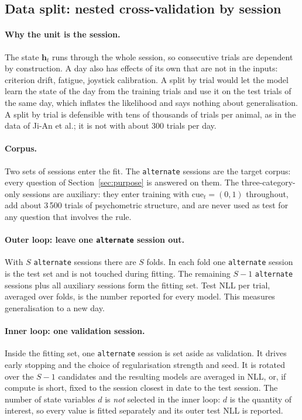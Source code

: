 \documentclass[11pt,a4paper]{article}
\newcommand{\vect}[1]{\bm{#1}}
\newcommand{\cue}{\mathrm{cue}}
\begin{document}
\subsection{Data split: nested cross-validation by session}
\label{sec:split}

\paragraph{Why the unit is the session.} The state $\vect{h}_t$ runs through the whole
session, so consecutive trials are dependent by construction. A day also has effects of
its own that are not in the inputs: criterion drift, fatigue, joystick calibration. A
split by trial would let the model learn the state of the day from the training trials
and use it on the test trials of the same day, which inflates the likelihood and says
nothing about generalisation. A split by trial is defensible with tens of thousands of
trials per animal, as in the data of Ji-An et al.; it is not with about 300 trials per
day.

\paragraph{Corpus.} Two sets of sessions enter the fit. The \texttt{alternate}
sessions are the target corpus: every question of Section~\ref{sec:purpose} is answered on them. The
three-category-only sessions are auxiliary: they enter training with
$\cue_t = (0, 1)$ throughout, add about 3\,500 trials of psychometric structure, and are
never used as test for any question that involves the rule.

\paragraph{Outer loop: leave one \texttt{alternate} session out.} With $S$
\texttt{alternate} sessions there are $S$ folds. In each fold one \texttt{alternate}
session is the test set and is not touched during fitting. The remaining $S-1$
\texttt{alternate} sessions plus all auxiliary sessions form the fitting set. Test NLL
per trial, averaged over folds, is the number reported for every model. This measures
generalisation to a new day.

\paragraph{Inner loop: one validation session.} Inside the fitting set, one
\texttt{alternate} session is set aside as validation. It drives early stopping and the
choice of regularisation strength and seed. It is rotated over the $S-1$ candidates and
the resulting models are averaged in NLL, or, if compute is short, fixed to the session
closest in date to the test session. The number of state variables $d$ is \emph{not}
selected in the inner loop: $d$ is the quantity of interest, so every value is fitted
separately and its outer test NLL is reported.
\end{document}
